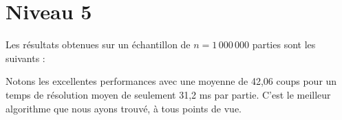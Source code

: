 \newpage
\section{Niveau 5}
Les résultats obtenues sur un échantillon de $n=1\,000\,000$ parties sont les suivants :

\begin{center}
\end{center}

Notons les excellentes performances avec une moyenne de 42,06 coups pour un temps de résolution moyen de seulement 31,2 ms par partie. C'est le meilleur algorithme que nous ayons trouvé, à tous points de vue.
